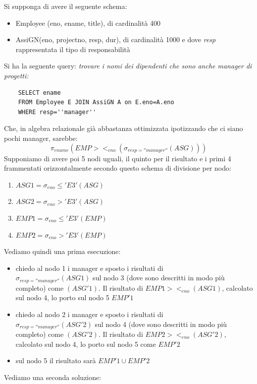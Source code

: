 \documentclass[a4paper,12pt, oneside]{book}
\begin{document}
\begin{esempio}
   \label{esempio:costi}
  Si supponga di avere il seguente schema:
  \begin{itemize}
    \item Employee (eno, ename, title), di cardinalità 400
    \item AssiGN(eno, projectno, resp, dur), di cardinalità 1000 e dove
    \emph{resp} rappresentata il tipo di responsabilità
  \end{itemize}
  Si ha la seguente query: \textit{trovare i nomi dei dipendenti che sono anche
    manager di progetti:}
  \begin{verbatim}
    SELECT ename
    FROM Employee E JOIN AssiGN A on E.eno=A.eno
    WHERE resp=''manager''
  \end{verbatim}
  Che, in algebra relazionale già abbastanza ottimizzata ipotizzando che ci
  siano pochi manager, sarebbe:
  \[\pi_{ename}(EMP><_{eno}(\sigma_{resp=''manager''}(ASG)))\]
  Supponiamo di avere poi 5 nodi uguali, il quinto per il risultato e i primi 4
  frammentati orizzontalmente secondo questo schema di divisione per nodo:
  \begin{enumerate}
    \item $ASG1=\sigma_{eno}\leq 'E3'(ASG)$
    \item $ASG2=\sigma_{eno}> 'E3'(ASG)$
    \item $EMP1=\sigma_{eno}\leq 'E3'(EMP)$
    \item $EMP2=\sigma_{eno}> 'E3'(EMP)$
  \end{enumerate}
  Vediamo quindi una prima esecuzione:
  \begin{itemize}
    \item chiedo al nodo 1 i manager e sposto i risultati di\\
    $\sigma_{resp=''manager''}(ASG1)$ sul nodo 3 (dove sono 
    descritti in modo più completo) come $(ASG'1)$. Il risultato di
    $EMP1><_{eno}(ASG1)$, calcolato sul nodo 4, lo porto sul nodo 5 $EMP'1$ 
    \item chiedo al nodo 2 i manager e sposto i risultati di\\
    $\sigma_{resp=''manager''}(ASG'2)$ sul nodo 4 (dove sono descritti in modo
    più completo) come $(ASG'2)$. Il risultato di $EMP2><_{eno}(ASG'2)$,
    calcolato sul nodo 4, lo porto sul nodo 5 come $EMP'2$ 
    \item sul nodo 5 il risultato sarà $EMP'1\cup EMP'2$
  \end{itemize}
  Vediamo una seconda soluzione:
  \begin{itemize}

\end{itemize}
\end{esempio}
\end{document}

